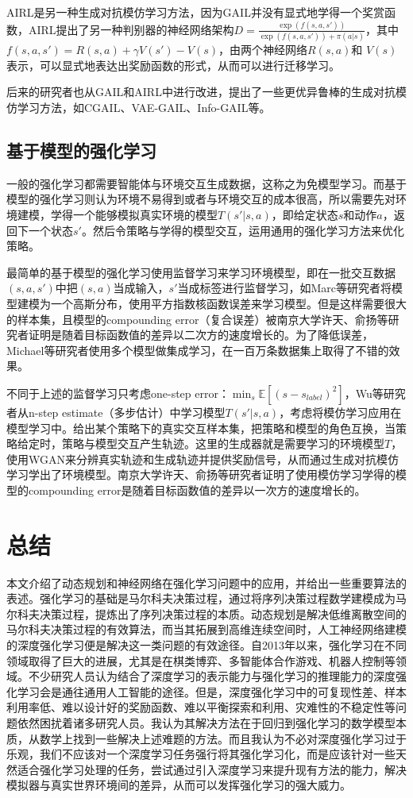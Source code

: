 \documentclass[lang=cn,11pt,a4paper,cite=number]{elegantpaper}
\begin{document}
AIRL\cite{fu2018learning}是另一种生成对抗模仿学习方法，因为GAIL并没有显式地学得一个奖赏函数，AIRL提出了另一种判别器的神经网络架构$D=\frac{\exp(f(s,a,s'))}{\exp(f(s,a,s'))+\pi(a|s)}$，其中$f(s,a,s')=R(s,a)+\gamma V(s')-V(s)$，由两个神经网络$R(s,a)$和 $V(s)$表示，可以显式地表达出奖励函数的形式，从而可以进行迁移学习。

后来的研究者也从GAIL和AIRL中进行改进，提出了一些更优异鲁棒的生成对抗模仿学习方法，如CGAIL\cite{9266753}、VAE-GAIL\cite{NIPS2017_044a23ca}、Info-GAIL\cite{sharma2019directedinfo}等。
\subsection{基于模型的强化学习}
一般的强化学习都需要智能体与环境交互生成数据，这称之为免模型学习。而基于模型的强化学习则认为环境不易得到或者与环境交互的成本很高，所以需要先对环境建模，学得一个能够模拟真实环境的模型$T(s'|s,a)$，即给定状态$s$和动作$a$，返回下一个状态$s'$。然后令策略与学得的模型交互，运用通用的强化学习方法来优化策略。

最简单的基于模型的强化学习使用监督学习来学习环境模型，即在一批交互数据$(s,a,s')$中把$(s,a)$当成输入，$s'$当成标签进行监督学习，如Marc等研究者\cite{j}将模型建模为一个高斯分布，使用平方指数核函数误差来学习模型。但是这样需要很大的样本集，且模型的compounding error（复合误差）被南京大学许天、俞扬等研究者证明是随着目标函数值的差异以二次方的速度增长的\cite{xu2020error}。为了降低误差，Michael等研究者\cite{janner2019trust}使用多个模型做集成学习，在一百万条数据集上取得了不错的效果。

不同于上述的监督学习只考虑one-step error：$\min_s\mathbb{E}[(s-s_{label})^2]$，Wu等研究者\cite{wu2020model}从n-step estimate（多步估计）中学习模型$T(s'|s,a)$，考虑将模仿学习应用在模型学习中。给出某个策略下的真实交互样本集，把策略和模型的角色互换，当策略给定时，策略与模型交互产生轨迹。这里的生成器就是需要学习的环境模型$T$，使用WGAN\cite{arjovsky2017wasserstein}来分辨真实轨迹和生成轨迹并提供奖励信号，从而通过生成对抗模仿学习学出了环境模型。南京大学许天、俞扬等研究者证明了使用模仿学习学得的模型的compounding error是随着目标函数值的差异以一次方的速度增长的\cite{xu2020error}。
\section{总结}
本文介绍了动态规划和神经网络在强化学习问题中的应用，并给出一些重要算法的表述。强化学习的基础是马尔科夫决策过程，通过将序列决策过程数学建模成为马尔科夫决策过程，提炼出了序列决策过程的本质。动态规划是解决低维离散空间的马尔科夫决策过程的有效算法，而当其拓展到高维连续空间时，人工神经网络建模的深度强化学习便是解决这一类问题的有效途径。自2013年以来，强化学习在不同领域取得了巨大的进展，尤其是在棋类博弈、多智能体合作游戏、机器人控制等领域。不少研究人员认为结合了深度学习的表示能力与强化学习的推理能力的深度强化学习会是通往通用人工智能的途径。但是，深度强化学习中的可复现性差、样本利用率低、难以设计好的奖励函数、难以平衡探索和利用、灾难性的不稳定性等问题依然困扰着诸多研究人员。我认为其解决方法在于回归到强化学习的数学模型本质，从数学上找到一些解决上述难题的方法。而且我认为不必对深度强化学习过于乐观，我们不应该对一个深度学习任务强行将其强化学习化，而是应该针对一些天然适合强化学习处理的任务，尝试通过引入深度学习来提升现有方法的能力，解决模拟器与真实世界环境间的差异，从而可以发挥强化学习的强大威力。



\end{document}

